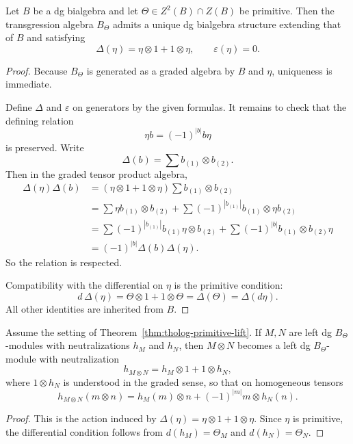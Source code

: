 \begin{theorem}
\label{thm:tholog-primitive-lift}
Let \(B\) be a dg bialgebra and let \(\Theta\in Z^{2}(B)\cap Z(B)\) be primitive.
Then the transgression algebra \(B_{\Theta}\) admits a unique dg bialgebra structure extending that of \(B\) and satisfying
\[
\Delta(\eta)=\eta\otimes 1+1\otimes \eta,
\qquad
\varepsilon(\eta)=0.
\]
\end{theorem}

\begin{proof}
Because \(B_{\Theta}\) is generated as a graded algebra by \(B\) and \(\eta\), uniqueness is immediate.

Define \(\Delta\) and \(\varepsilon\) on generators by the given formulas.
It remains to check that the defining relation
\[
\eta b=(-1)^{|b|}b\eta
\]
is preserved.
Write
\[
\Delta(b)=\sum b_{(1)}\otimes b_{(2)}.
\]
Then in the graded tensor product algebra,
\begin{align*}
\Delta(\eta)\Delta(b)
&=
(\eta\otimes 1+1\otimes \eta)\sum b_{(1)}\otimes b_{(2)}
\\
&=
\sum \eta b_{(1)}\otimes b_{(2)}+\sum (-1)^{|b_{(1)}|}b_{(1)}\otimes \eta b_{(2)}
\\
&=
\sum (-1)^{|b_{(1)}|}b_{(1)}\eta\otimes b_{(2)}
+\sum (-1)^{|b|}b_{(1)}\otimes b_{(2)}\eta
\\
&=
(-1)^{|b|}\Delta(b)\Delta(\eta).
\end{align*}
So the relation is respected.

Compatibility with the differential on \(\eta\) is the primitive condition:
\[
d\,\Delta(\eta)
=
\Theta\otimes 1+1\otimes \Theta
=
\Delta(\Theta)
=
\Delta(d\eta).
\]
All other identities are inherited from \(B\).
\end{proof}

\begin{corollary}
\label{cor:tholog-fusion-neutralizations}
Assume the setting of Theorem~\ref{thm:tholog-primitive-lift}.
If \(M,N\) are left dg \(B_{\Theta}\)-modules with neutralizations \(h_{M}\) and \(h_{N}\), then \(M\otimes N\) becomes a left dg \(B_{\Theta}\)-module with neutralization
\[
h_{M\otimes N}=h_{M}\otimes 1+1\otimes h_{N},
\]
where \(1\otimes h_{N}\) is understood in the graded sense, so that on homogeneous tensors
\[
h_{M\otimes N}(m\otimes n)=h_{M}(m)\otimes n+(-1)^{|m|}m\otimes h_{N}(n).
\]
\end{corollary}

\begin{proof}
This is the action induced by \(\Delta(\eta)=\eta\otimes 1+1\otimes \eta\).
Since \(\eta\) is primitive, the differential condition follows from \(d(h_{M})=\Theta_{M}\) and \(d(h_{N})=\Theta_{N}\).
\end{proof}


